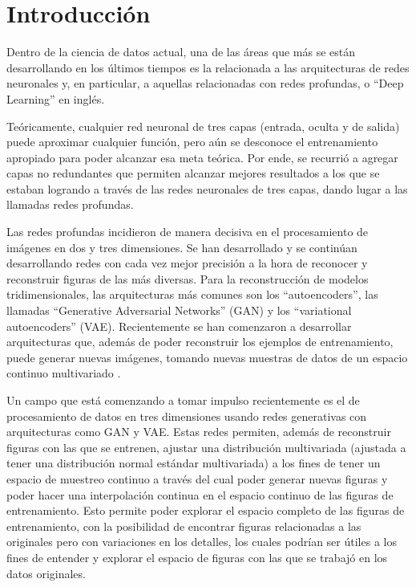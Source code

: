 \documentclass[spanish]{article}
\begin{document}




\section{Introducción}

Dentro de la ciencia de datos actual, una de las áreas que más se
están desarrollando en los últimos tiempos es la relacionada a las
arquitecturas de redes neuronales y, en particular, a aquellas relacionadas
con redes profundas, o ``Deep Learning'' en inglés.

Teóricamente, cualquier red neuronal de tres capas (entrada, oculta
y de salida) puede aproximar cualquier función, pero aún se desconoce
el entrenamiento apropiado para poder alcanzar esa meta teórica.
Por ende, se recurrió a agregar capas no redundantes que permiten
alcanzar mejores resultados a los que se estaban logrando a través
de las redes neuronales de tres capas, dando lugar a las llamadas
redes profundas.

Las redes profundas incidieron de manera decisiva en el procesamiento
de imágenes en dos y tres dimensiones. Se han desarrollado y se continúan
desarrollando redes con cada vez mejor precisión a la hora de reconocer
y reconstruir figuras de las más diversas. Para la reconstrucción
de modelos tridimensionales, las arquitecturas más comunes son los ``autoencoders'',
las llamadas ``Generative Adversarial Networks'' (GAN) y los ``variational
autoencoders'' (VAE). Recientemente se han comenzaron a desarrollar
arquitecturas que, además de poder reconstruir los ejemplos de entrenamiento,
puede generar nuevas imágenes, tomando nuevas muestras de datos de
un espacio continuo multivariado \cite{Karras2018}.

Un campo que está comenzando a tomar impulso recientemente es el de
procesamiento de datos en tres dimensiones usando redes generativas
con arquitecturas como GAN y VAE. Estas redes permiten, además de
reconstruir figuras con las que se entrenen, ajustar una distribución
multivariada (ajustada a tener una distribución normal estándar multivariada)
a los fines de tener un espacio de muestreo continuo a través del cual poder generar
nuevas figuras y poder hacer una interpolación continua en el espacio continuo de
las figuras de entrenamiento. Esto permite poder explorar el espacio completo de las
figuras de entrenamiento, con la posibilidad de encontrar figuras relacionadas a las
originales pero con variaciones en los detalles, los cuales podrían ser útiles a los
fines de entender y explorar el espacio de figuras con las que se trabajó en los
datos originales.
\end{document}
